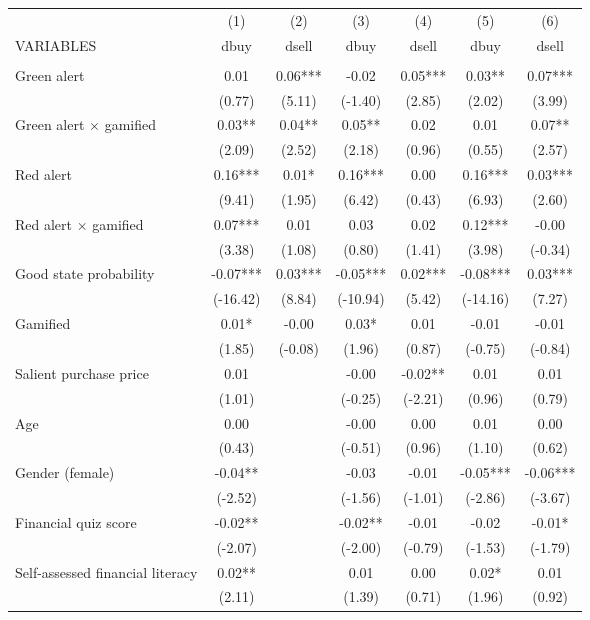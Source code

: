 \documentclass[]{article}
\begin{document}
\begin{tabular}{lcccccc} \hline
 & (1) & (2) & (3) & (4) & (5) & (6) \\
VARIABLES & dbuy & dsell & dbuy & dsell & dbuy & dsell \\ \hline
 &  &  &  &  &  &  \\
Green alert & 0.01 & 0.06*** & -0.02 & 0.05*** & 0.03** & 0.07*** \\
 & (0.77) & (5.11) & (-1.40) & (2.85) & (2.02) & (3.99) \\
Green alert $\times$ gamified & 0.03** & 0.04** & 0.05** & 0.02 & 0.01 & 0.07** \\
 & (2.09) & (2.52) & (2.18) & (0.96) & (0.55) & (2.57) \\
Red alert & 0.16*** & 0.01* & 0.16*** & 0.00 & 0.16*** & 0.03*** \\
 & (9.41) & (1.95) & (6.42) & (0.43) & (6.93) & (2.60) \\
Red alert $\times$ gamified & 0.07*** & 0.01 & 0.03 & 0.02 & 0.12*** & -0.00 \\
 & (3.38) & (1.08) & (0.80) & (1.41) & (3.98) & (-0.34) \\
Good state probability & -0.07*** & 0.03*** & -0.05*** & 0.02*** & -0.08*** & 0.03*** \\
 & (-16.42) & (8.84) & (-10.94) & (5.42) & (-14.16) & (7.27) \\
Gamified & 0.01* & -0.00 & 0.03* & 0.01 & -0.01 & -0.01 \\
 & (1.85) & (-0.08) & (1.96) & (0.87) & (-0.75) & (-0.84) \\
Salient purchase price & 0.01 &  & -0.00 & -0.02** & 0.01 & 0.01 \\
 & (1.01) &  & (-0.25) & (-2.21) & (0.96) & (0.79) \\
Age & 0.00 &  & -0.00 & 0.00 & 0.01 & 0.00 \\
 & (0.43) &  & (-0.51) & (0.96) & (1.10) & (0.62) \\
Gender (female) & -0.04** &  & -0.03 & -0.01 & -0.05*** & -0.06*** \\
 & (-2.52) &  & (-1.56) & (-1.01) & (-2.86) & (-3.67) \\
Financial quiz score & -0.02** &  & -0.02** & -0.01 & -0.02 & -0.01* \\
 & (-2.07) &  & (-2.00) & (-0.79) & (-1.53) & (-1.79) \\
Self-assessed financial literacy & 0.02** &  & 0.01 & 0.00 & 0.02* & 0.01 \\
 & (2.11) &  & (1.39) & (0.71) & (1.96) & (0.92) \\

\end{tabular}
\end{document}
